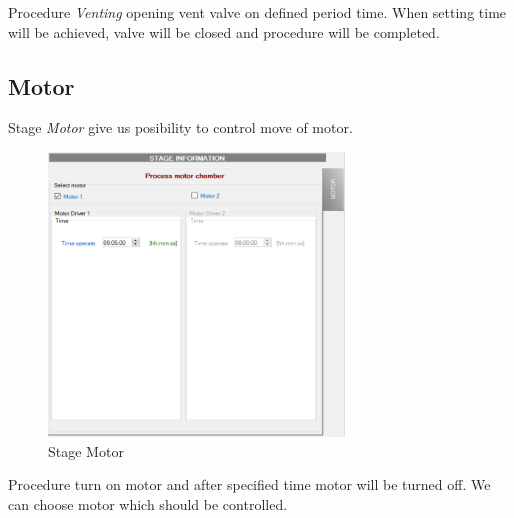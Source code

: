 Procedure \textit{Venting} opening vent valve on defined period time. When setting time will be achieved, valve will be closed and procedure will be completed. 

\subsection{Motor}

Stage \textit{Motor} give us posibility to control move of motor.

	\begin{figure}[!h] 
	\centering \includegraphics[width=0.7\textwidth]{Graphic/Programs/Motor.png}	
	\caption{Stage Motor}
	\label{stage_motor}
	\end{figure}
	\FloatBarrier

Procedure turn on motor and after specified time motor will be turned off. We can choose motor which should be controlled.

